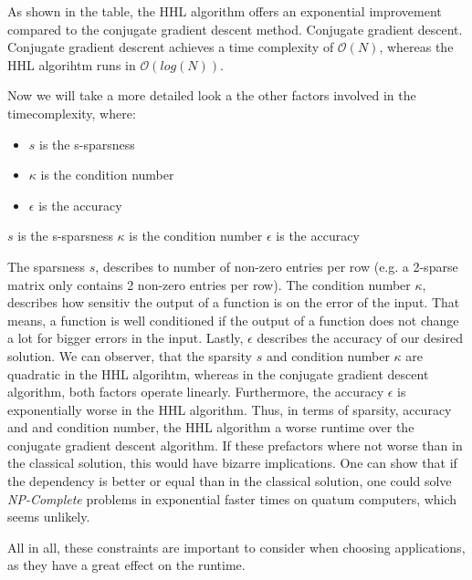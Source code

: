 As shown in the table, the HHL algorithm offers an exponential improvement compared to the conjugate gradient descent method.
Conjugate gradient descent.
Conjugate gradient descrent achieves a time complexity of $\mathcal{O}(N)$, whereas the HHL algorihtm runs in $\mathcal{O}(log(N))$.

Now we will take a more detailed look a the other factors involved in the timecomplexity, where:
\begin{itemize}
    \item $s$ is the s-sparsness
    \item $\kappa$ is the condition number
    \item $\epsilon$ is the accuracy
\end{itemize}
$s$ is the s-sparsness
$\kappa$ is the condition number
$\epsilon$ is the accuracy

The sparsness $s$, describes to number of non-zero entries per row
(e.g. a 2-sparse matrix only contains 2 non-zero entries per row).
The condition number $\kappa$, describes how sensitiv the output of a function is on the error of the input.
That means, a function is well conditioned if the output of a function does not change a lot for bigger errors in the input. 
Lastly, $\epsilon$ describes the accuracy of our desired solution.
We can observer, that the sparsity $s$ and condition number $\kappa$ are quadratic in the HHL algorihtm, whereas in the conjugate gradient descent algorithm, both factors operate linearly.
Furthermore, the accuracy $\epsilon$ is exponentially worse in the HHL algorithm. 
Thus, in terms of sparsity, accuracy and and condition number, the HHL algorithm a worse runtime over the conjugate gradient descent algorithm.
If these prefactors where not worse than in the classical solution, this would have bizarre implications. 
One can show that if the dependency is better or equal than in the classical solution, one could solve \textit{NP-Complete} problems in exponential faster times on quatum computers, which seems unlikely.

All in all, these constraints are important to consider when choosing applications, as they have a great effect on the runtime. 




